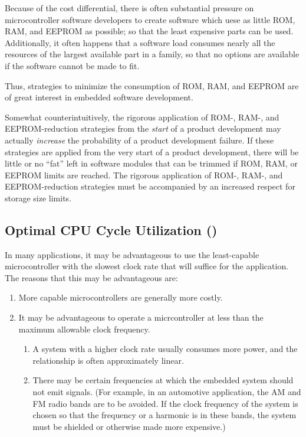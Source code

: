 Because of the cost differential, there is often substantial pressure
on microcontroller software developers to create software which
uese as little ROM, RAM, and EEPROM as possible; so that the least
expensive parts can be used.  Additionally, it often happens that
a software load consumes nearly all the resources of the
largest available part in a family, so that no options are available
if the software cannot be made to fit.

Thus, strategies to minimize the consumption of ROM, RAM, and EEPROM
are of great interest in embedded software development.

Somewhat counterintuitively, the rigorous application of ROM-, RAM-, and
EEPROM-reduction strategies from the \emph{start} of a product development
may actually \emph{increase} the probability of a product development 
failure.  If these strategies are applied from the very start of a 
product development, there will be little or no ``fat'' left in software modules
that can be trimmed if ROM, RAM, or EEPROM limits are reached.
The rigorous application of ROM-, RAM-, and EEPROM-reduction strategies
must be accompanied by an increased respect for storage size limits.


\subsection[Optimal CPU Cycle Utilization]
           {Optimal CPU Cycle Utilization 
           ()}
\label{chgr0:sdda0:bcc0}

In many applications, it may be advantageous to use the least-capable
microcontroller with the slowest clock rate that will suffice for the
application.  The reasons that this may be advantageous are:

\begin{enumerate}
\item More capable microcontrollers are generally more costly.
\item It may be advantageous to operate a micrcontroller at less than
      the maximum allowable clock frequency.
   \begin{enumerate}
   \item A system with a higher clock rate usually consumes more power, and
         the relationship is often approximately linear.
   \item There may be certain frequencies at which the embedded system should
         not emit signals.  (For example, in an automotive application, the 
		 AM and FM radio bands are to be avoided.  If the clock frequency of
		 the system is chosen so that the frequency or a harmonic is in these
		 bands, the system must be shielded or otherwise made more expensive.)
   \end{enumerate}
\end{enumerate}

